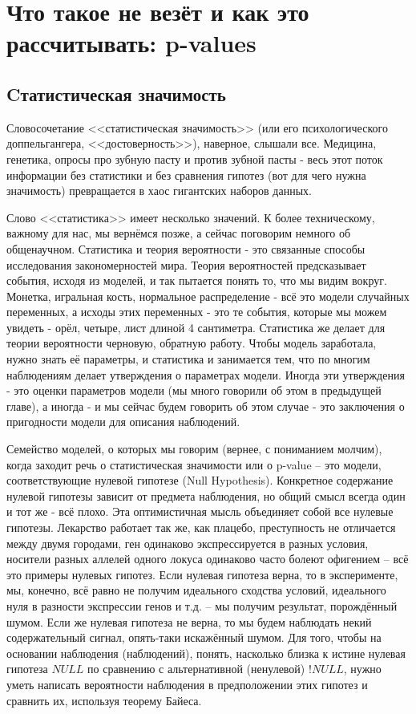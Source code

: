 \documentclass{book}
\begin{document}
 

\chapter[Что такое не везёт: p-values]{Что такое не везёт и как это рассчитывать: p-values}

\section*{Cтатистическая значимость}

Словосочетание <<статистическая значимость>> (или его психологического доппельгангера, <<достоверность>>), наверное, слышали все. Медицина, генетика, опросы про зубную пасту и против зубной пасты - весь этот поток информации без статистики и без сравнения гипотез (вот для чего нужна значимость) превращается в хаос гигантских наборов данных.

Слово <<статистика>> имеет несколько значений. К более техническому, важному для нас, мы вернёмся позже, а сейчас поговорим немного об общенаучном. Статистика и теория вероятности - это связанные способы исследования закономерностей мира. Теория вероятностей предсказывает события, исходя из моделей, и так пытается понять то, что мы видим вокруг. Монетка, игральная кость, нормальное распределение - всё это модели случайных переменных, а исходы этих переменных - это те события, которые мы можем увидеть - орёл, четыре, лист длиной 4 сантиметра. Статистика же делает для теории вероятности черновую, обратную работу. Чтобы модель заработала, нужно знать её параметры, и статистика и занимается тем, что по многим наблюдениям делает утверждения о параметрах модели. Иногда эти утверждения - это оценки параметров модели (мы много говорили об этом в предыдущей главе), а иногда - и мы сейчас будем говорить об этом случае - это заключения о пригодности модели для описания наблюдений.

Семейство моделей, о которых мы говорим (вернее, с пониманием молчим), когда заходит речь о статистическая значимости или о p-value -- это модели, соответствующие нулевой гипотезе (Null Hypothesis). Конкретное содержание нулевой гипотезы зависит от предмета наблюдения, но общий смысл всегда один и тот же - всё плохо. Эта оптимистичная мысль объединяет собой все нулевые гипотезы. Лекарство работает так же, как плацебо, преступность не отличается между двумя городами, ген одинаково экспрессируется в разных условия, носители разных аллелей одного локуса одинаково часто болеют офигением -- всё это примеры нулевых гипотез. Если нулевая гипотеза верна, то в эксперименте, мы, конечно, всё равно не получим идеального сходства условий, идеального нуля в разности экспрессии генов и т.д. -- мы получим результат, порождённый шумом. Если же нулевая гипотеза не верна, то мы будем наблюдать некий содержательный сигнал, опять-таки искажённый шумом. Для того, чтобы на основании наблюдения (наблюдений), понять, насколько близка к истине нулевая гипотеза $NULL$ по сравнению с альтернативной (ненулевой) $!NULL$, нужно уметь написать вероятности наблюдения в предположении этих гипотез и сравнить их, используя теорему Байеса. 
\end{document}
